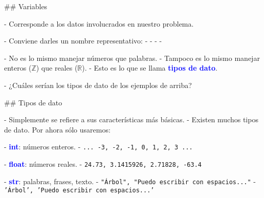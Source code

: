 ## Variables

- Corresponde a los datos involucrados en nuestro problema.

- Conviene darles un nombre representativo:
    - 
    - 
    - 
    - 

\pause
\vspace{-.8ex}

- No es lo mismo manejar números que palabras.
    - Tampoco es lo mismo manejar enteros ($\mathbb{Z}$) que reales ($\mathbb{R}$).
    - Esto es lo que se llama \textcolor{blue}{\textbf{tipos de dato}}.


- ¿Cuáles serían los tipos de dato de los ejemplos de arriba?

## Tipos de dato

- Simplemente se refiere a sus características más básicas.
- Existen muchos tipos de dato. Por ahora sólo usaremos:
    \pause

    - \textcolor{blue}{\textbf{int}}: números enteros.
        - \texttt{... -3, -2, -1, 0, 1, 2, 3 ...}

    \pause

    - \textcolor{blue}{\textbf{float}}: números reales.
        - \texttt{24.73, 3.1415926, 2.71828, -63.4}

    \pause

    - \textcolor{blue}{\textbf{str}}: palabras, frases, texto.
        - \texttt{"Árbol", "Puedo escribir con espacios..."}
        - \texttt{'Árbol', 'Puedo escribir con espacios...'}

\vfill
